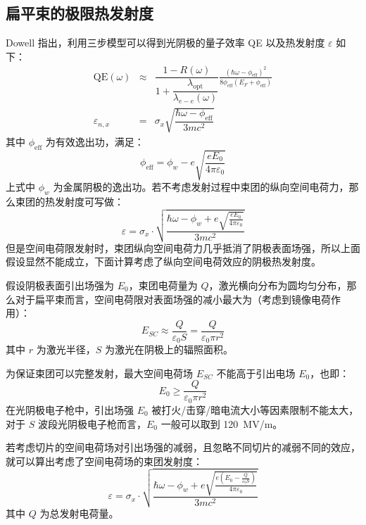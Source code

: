 \subsection{扁平束的极限热发射度}
Dowell 指出，利用三步模型可以得到光阴极的量子效率 QE 以及热发射度 $\varepsilon$ 如下：
\begin{eqnarray*}
\text{QE}(\omega) &\approx& \dfrac{1-R(\omega)}{1+\dfrac{\lambda_{\text{opt}}}{\lambda_{e-e}(\omega)}}\frac{(\hbar\omega-\phi_{\text{eff}})^2}{8\phi_{\text{eff}}(E_F+\phi_{\text{eff}})}\\
\varepsilon_{n,x} &=& \sigma_x\sqrt{\dfrac{\hbar\omega-\phi_{\text{eff}}}{3mc^2}}
\end{eqnarray*}
其中 $\phi_{\text{eff}}$ 为有效逸出功，满足：
\[
\phi_{\text{eff}} = \phi_{w} - e\sqrt{\frac{eE_0}{4\pi\varepsilon_0}}
\]
上式中 $\phi_{w}$ 为金属阴极的逸出功。若不考虑发射过程中束团的纵向空间电荷力，那么束团的热发射度可写做：
\begin{equation}
\varepsilon = \sigma_x\cdot\sqrt{\frac{\hbar\omega-\phi_w+e\sqrt{\frac{eE_0}{4\pi\varepsilon_0}}}{3mc^2}}
\label{eq:tot-emit-none}
\end{equation}
但是空间电荷限发射时，束团纵向空间电荷力几乎抵消了阴极表面场强，所以上面假设显然不能成立，下面计算考虑了纵向空间电荷效应的阴极热发射度。

假设阴极表面引出场强为 $E_0$，束团电荷量为 $Q$，激光横向分布为圆均匀分布，那么对于扁平束而言，空间电荷限对表面场强的减小最大为（考虑到镜像电荷作用）：
\begin{equation}
E_{SC} \approx \frac{Q}{\varepsilon_0S} = \frac{Q}{\varepsilon_0\pi r^2}
\label{eq:e-sc-pancake}
\end{equation}
其中 $r$ 为激光半径，$S$ 为激光在阴极上的辐照面积。

为保证束团可以完整发射，最大空间电荷场 $E_{SC}$ 不能高于引出电场 $E_0$，也即：
\begin{equation}
E_0 \ge \frac{Q}{\varepsilon_0\pi r^2}
\label{eq:sc-limit}
\end{equation}
在光阴极电子枪中，引出场强 $E_0$ 被打火/击穿/暗电流大小等因素限制不能太大，对于 $S$ 波段光阴极电子枪而言，$E_0$ 一般可以取到 \SI{120}{MV/m}。

若考虑切片的空间电荷场对引出场强的减弱，且忽略不同切片的减弱不同的效应，就可以算出考虑了空间电荷场的束团发射度：
\begin{equation}
\varepsilon = \sigma_x\cdot\sqrt{\frac{\hbar\omega-\phi_w+e\sqrt{\frac{e\left(E_0-\frac{Q}{\varepsilon_0 S}\right)}{4\pi\varepsilon_0}}}{3mc^2}}
\label{eq:tot-emit-orig}
\end{equation}
其中 $Q$ 为总发射电荷量。

